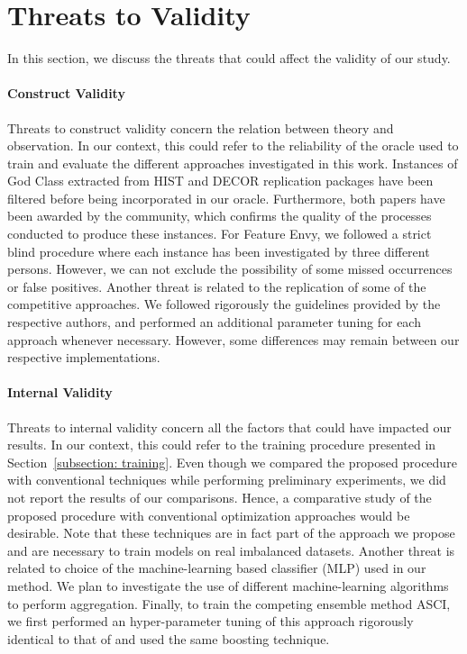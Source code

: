 

\section{Threats to Validity}
\label{section: threats}

In this section, we discuss the threats that could affect the validity of our study.

\paragraph{Construct Validity} Threats to construct validity concern the relation between theory and observation. In our context, this could refer to the reliability of the oracle used to train and evaluate the different approaches investigated in this work. Instances of God Class extracted from HIST and DECOR replication packages have been filtered before being incorporated in our oracle. Furthermore, both papers have been awarded by the community, which confirms the quality of the processes conducted to produce these instances. For Feature Envy, we followed a strict blind procedure where each instance has been investigated by three different persons. However, we can not exclude the possibility of some missed occurrences or false positives. Another threat is related to the replication of some of the competitive approaches. We followed rigorously the guidelines provided by the respective authors, and performed an additional parameter tuning for each approach whenever necessary. However, some differences may remain between our respective implementations.

\paragraph{Internal Validity} Threats to internal validity concern all the factors that could have impacted our results. In our context, this could refer to the training procedure presented in Section~\ref{subsection: training}. Even though we compared the proposed procedure with conventional techniques while performing preliminary experiments, we did not report the results of our comparisons. Hence, a comparative study of the proposed procedure with conventional optimization approaches would be desirable. Note that these techniques are in fact part of the approach we propose and are necessary to train models on real imbalanced datasets. Another threat is related to choice of the machine-learning based classifier (MLP) used in our method. We plan to investigate the use of different machine-learning algorithms to perform aggregation. Finally, to train the competing ensemble method ASCI, we first performed an hyper-parameter tuning of this approach rigorously identical to that of \NAME{} and used the same boosting technique.

